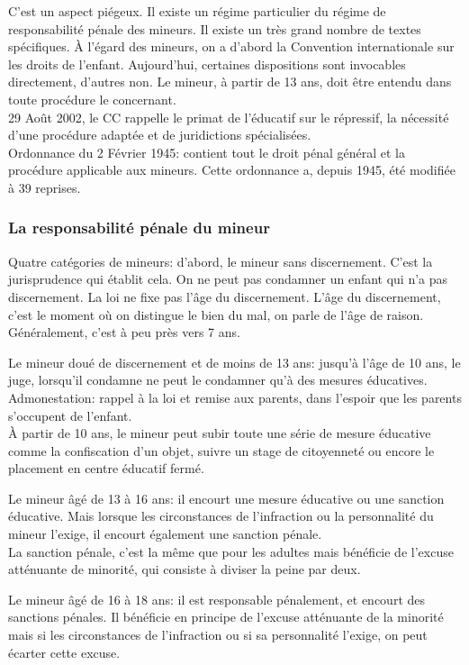\documentclass[10pt, a4paper, openany]{book}
\begin{document}
C'est un aspect piégeux. Il existe un régime particulier du régime de responsabilité pénale des mineurs. Il existe un très grand nombre de textes spécifiques. À l'égard des mineurs, on a d'abord la Convention internationale sur les droits de l'enfant. Aujourd'hui, certaines dispositions sont invocables directement, d'autres non. Le mineur, à partir de 13 ans, doit être entendu dans toute procédure le concernant. \\
29 Août 2002, le CC rappelle le primat de l'éducatif sur le répressif, la nécessité d'une procédure adaptée et de juridictions spécialisées. \\
Ordonnance du 2 Février 1945: contient tout le droit pénal général et la procédure applicable aux mineurs. Cette ordonnance a, depuis 1945, été modifiée à 39 reprises. 

\subsubsection{La responsabilité pénale du mineur}

Quatre catégories de mineurs: d'abord, le mineur sans discernement. C'est la jurisprudence qui établit cela. On ne peut pas condamner un enfant qui n'a pas discernement. La loi ne fixe pas l'âge du discernement. L'âge du discernement, c'est le moment où on distingue le bien du mal, on parle de l'âge de raison. Généralement, c'est à peu près vers 7 ans.


Le mineur doué de discernement et de moins de 13 ans: jusqu'à l'âge de 10 ans, le juge, lorsqu'il condamne ne peut le condamner qu'à des mesures éducatives. Admonestation: rappel à la loi et remise aux parents, dans l'espoir que les parents s'occupent de l'enfant. \\
À partir de 10 ans, le mineur peut subir toute une série de mesure éducative comme la confiscation d'un objet, suivre un stage de citoyenneté ou encore le placement en centre éducatif fermé. 


Le mineur âgé de 13 à 16 ans: il encourt une mesure éducative ou une sanction éducative. Mais lorsque les circonstances de l'infraction ou la personnalité du mineur l'exige, il encourt également une sanction pénale. \\
La sanction pénale, c'est la même que pour les adultes mais bénéficie de l'excuse atténuante de minorité, qui consiste à diviser la peine par deux. 


Le mineur âgé de 16 à 18 ans: il est responsable pénalement, et encourt des sanctions pénales. Il bénéficie en principe de l'excuse atténuante de la minorité mais si les circonstances de l'infraction ou si sa personnalité l'exige, on peut écarter cette excuse. 
\end{document}
